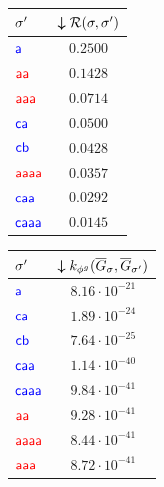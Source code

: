 \begin{table}[!t]
{\begin{tabular}{l|c}
	{${\sigma'}$} &
	{$\boldsymbol{\downarrow}\mathcal{R}(\sigma,{\sigma'})$} \\
	
	
	\midrule
	$\mathsf{\color{blue}a}$  &  $0.2500$ \\
	$\mathsf{\color{red}aa}$  &  $0.1428$  \\
	$\mathsf{\color{red}aaa}$  & $0.0714$ \\
	$\mathsf{\color{blue}ca}$  &   $0.0500$\\
	$\mathsf{\color{blue}cb}$  & $0.0428$ \\
	$\mathsf{\color{red}aaaa}$  &  $0.0357$ \\
	$\mathsf{\color{blue}caa}$  &  $0.0292$ \\
	$\mathsf{\color{blue}caaa}$  &   $0.0145$ \\
	\bottomrule
\end{tabular}\quad	\begin{tabular}{l|c}
	\toprule
	
	{${\sigma'}$} &
	{$\boldsymbol{\downarrow}k_{{\phi^{g}}}(\overline{G}_\sigma,\overline{G}_{{\sigma'}})$} \\

	
	\midrule
	$\mathsf{\color{blue}a}$  & $8.16\cdot 10^{-21}$ \\
	$\mathsf{\color{blue}ca}$  &   $1.89\cdot 10^{-24}$\\
	$\mathsf{\color{blue}cb}$  &   $7.64\cdot 10^{-25}$\\
	$\mathsf{\color{blue}caa}$  &$1.14\cdot 10^{-40}$\\
	$\mathsf{\color{blue}caaa}$  &  $9.84\cdot 10^{-41}$\\
	$\mathsf{\color{red}aa}$  &  $9.28\cdot 10^{-41}$ \\
	$\mathsf{\color{red}aaaa}$  & $8.44\cdot 10^{-41}$\\
	$\mathsf{\color{red}aaa}$  &  $8.72\cdot 10^{-41}$\\
	\bottomrule
\end{tabular}}
\end{table}




